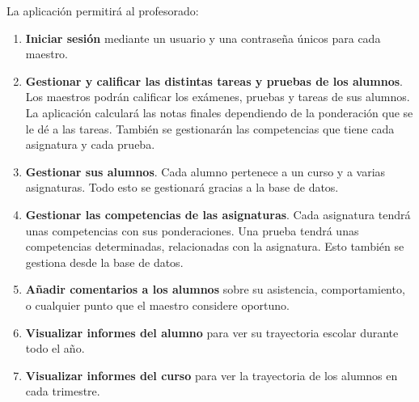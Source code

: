 La aplicación permitirá al profesorado:
\begin{enumerate}
	\item \textbf{Iniciar sesión} mediante un usuario y una contraseña únicos para cada maestro.
	\item \textbf{Gestionar y calificar las distintas tareas y pruebas de los alumnos}. Los maestros podrán calificar los exámenes, pruebas y tareas de sus alumnos. La aplicación calculará las notas finales dependiendo de la ponderación que se le dé a las tareas. También se gestionarán las competencias que tiene cada asignatura y cada prueba.
	\item \textbf{Gestionar sus alumnos}. Cada alumno pertenece a un curso y a varias asignaturas. Todo esto se gestionará gracias a la base de datos.
	\item \textbf{Gestionar las competencias de las asignaturas}. Cada asignatura tendrá unas competencias con sus ponderaciones. Una prueba tendrá unas competencias determinadas, relacionadas con la asignatura. Esto también se gestiona desde la base de datos.
	\item \textbf{Añadir comentarios a los alumnos} sobre su asistencia, comportamiento, o cualquier punto que el maestro considere oportuno.
	\item \textbf{Visualizar informes del alumno} para ver su trayectoria escolar durante todo el año.
	\item \textbf{Visualizar informes del curso} para ver la trayectoria de los alumnos en cada trimestre.
	

\end{enumerate}

